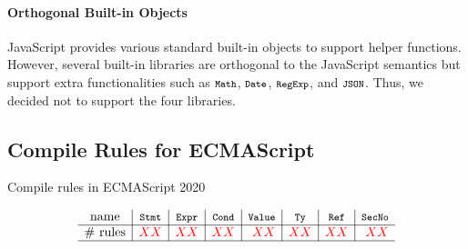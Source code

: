 \paragraph{Orthogonal Built-in Objects}
JavaScript provides various standard built-in objects to support
helper functions.  However, several built-in libraries are orthogonal
to the JavaScript semantics but support extra functionalities such as
\( \texttt{\footnotesize Math} \), \( \texttt{\footnotesize Date} \), \( \texttt{\footnotesize RegExp} \), and
\( \texttt{\footnotesize JSON} \).  Thus, we decided not to support the four libraries.

\subsection{Compile Rules for ECMAScript}

\begin{table}[t]
  \centering
  \caption{Compile rules in ECMAScript 2020}
  \label{table:rules}
\vspace*{-1em}
  \[
    \begin{array}{c|r|r|r|r|r|r|r}
      \text{name}
      & \multicolumn{1}{c|}{\code{Stmt}}
      & \multicolumn{1}{c|}{\code{Expr}}
      & \multicolumn{1}{c|}{\code{Cond}}
      & \multicolumn{1}{c|}{\code{Value}}
      & \multicolumn{1}{c|}{\code{Ty}}
      & \multicolumn{1}{c|}{\code{Ref}}
      & \multicolumn{1}{c}{\code{SecNo}}\\\hline
      \text{\# rules}
      & \inred{XX}
      & \inred{XX}
      & \inred{XX}
      & \inred{XX}
      & \inred{XX}
      & \inred{XX}
      & \inred{XX}\\\hline
    \end{array}
  \]
\end{table}

